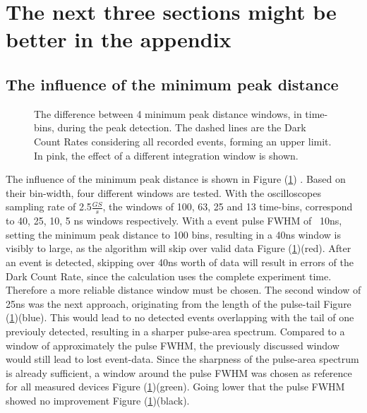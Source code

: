 \documentclass[article,type=msc,colorback,accentcolor=tud9c]{tudthesis}
\begin{document}
\newpage
\section{The next three sections might be better in the appendix}
\subsection{The influence of the minimum peak distance}
\label{subsec:subsec_mpd}
\begin{figure}[h]
\begin{centering}
\caption{The difference between 4 minimum peak distance windows, in time-bins, during the peak detection. The dashed lines are the Dark Count Rates considering all recorded events, forming an upper limit. In pink, the effect of a different integration window is shown.}
\label{fig:MPD_plot}
\end{centering}
\end{figure}
The influence of the minimum peak distance is shown in Figure (\ref{fig:MPD_plot}) . Based on their bin-width, four different windows are tested. With the oscilloscopes sampling rate of 2.5$\frac{GS}{s}$, the windows of 100, 63, 25 and 13 time-bins, correspond to 40, 25, 10, 5 ns windows respectively. With a event pulse FWHM of ~10ns, setting the minimum peak distance to 100 bins, resulting in a 40ns window is visibly to large, as the algorithm will skip over valid data Figure (\ref{fig:MPD_plot})(red). After an event is detected, skipping over 40ns worth of data will result in errors of the Dark Count Rate, since the calculation uses the complete experiment time. Therefore a more reliable distance window must be chosen. The second window of 25ns was the next approach, originating from the length of the pulse-tail Figure (\ref{fig:MPD_plot})(blue). This would lead to no detected events overlapping with the tail of one previouly detected, resulting in a sharper pulse-area spectrum. Compared to a window of approximately the pulse FWHM, the previously discussed window would still lead to lost event-data. Since the sharpness of the pulse-area spectrum is already sufficient, a window around the pulse FWHM was chosen as reference for all measured devices Figure (\ref{fig:MPD_plot})(green). Going lower that the pulse FWHM showed no improvement Figure (\ref{fig:MPD_plot})(black). 
\end{document}
